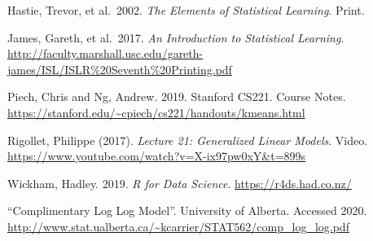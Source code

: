 \documentclass[
  openany]{book}
\begin{document}
Hastie, Trevor, et al.~2002. \emph{The Elements of Statistical Learning}. Print.

James, Gareth, et al.~2017. \emph{An Introduction to Statistical Learning}.
\url{http://faculty.marshall.usc.edu/gareth-james/ISL/ISLR\%20Seventh\%20Printing.pdf}

Piech, Chris and Ng, Andrew. 2019. Stanford CS221. Course Notes. \url{https://stanford.edu/~cpiech/cs221/handouts/kmeans.html}

Rigollet, Philippe (2017). \emph{Lecture 21: Generalized Linear Models}. Video. \url{https://www.youtube.com/watch?v=X-ix97pw0xY\&t=899s}

Wickham, Hadley. 2019. \emph{R for Data Science}. \url{https://r4ds.had.co.nz/}

``Complimentary Log Log Model''. University of Alberta. Accessed 2020. \url{http://www.stat.ualberta.ca/~kcarrier/STAT562/comp_log_log.pdf}

  
\end{document}
